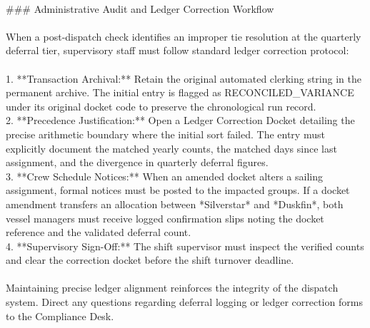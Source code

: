 \begin{exbox}
{  \  \\
  \#\#\# Administrative Audit and Ledger Correction Workflow \\
  \  \\
  When a post-dispatch check identifies an improper tie resolution at the quarterly deferral tier, supervisory staff must follow standard ledger correction protocol: \\
  \  \\
  1. **Transaction Archival:** Retain the original automated clerking string in the permanent archive. The initial entry is flagged as \textasciigrave{}RECONCILED\_VARIANCE\textasciigrave{} under its original docket code to preserve the chronological run record. \\
  2. **Precedence Justification:** Open a Ledger Correction Docket detailing the precise arithmetic boundary where the initial sort failed. The entry must explicitly document the matched yearly counts, the matched days since last assignment, and the divergence in quarterly deferral figures. \\
  3. **Crew Schedule Notices:** When an amended docket alters a sailing assignment, formal notices must be posted to the impacted groups. If a docket amendment transfers an allocation between *Silverstar* and *Duskfin*, both vessel managers must receive logged confirmation slips noting the docket reference and the validated deferral count. \\
  4. **Supervisory Sign-Off:** The shift supervisor must inspect the verified counts and clear the correction docket before the shift turnover deadline. \\
  \  \\
  Maintaining precise ledger alignment reinforces the integrity of the dispatch system. Direct any questions regarding deferral logging or ledger correction forms to the Compliance Desk.}
\end{exbox}
